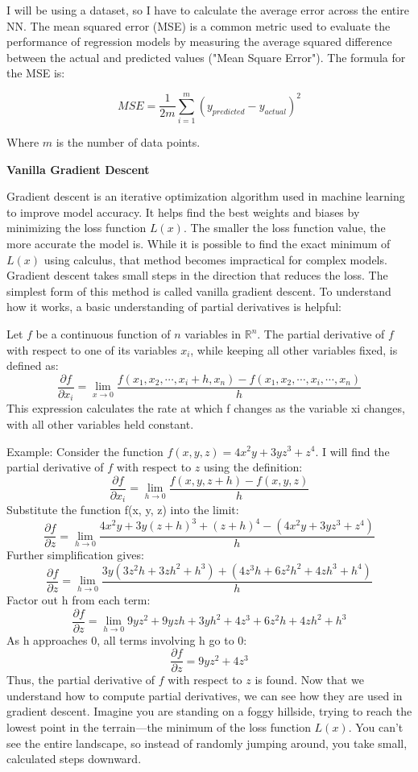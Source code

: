 \documentclass[12pt]{article}
\theoremstyle{definition}
\begin{document}
I will be using a dataset, so I have to calculate the average error across the entire NN. The mean squared error (MSE) is a common metric used to evaluate the performance of regression models by measuring the average squared difference between the actual and predicted values ("Mean Square Error"). The formula for the MSE is:

\[
MSE = \frac{1}{2m} \sum_{i=1}^{m} (y_{predicted} - y_{actual})^2
\]

Where \( m \) is the number of data points.

\begin{flushleft}
\textbf{Vanilla Gradient Descent}
\end{flushleft}

Gradient descent is an iterative optimization algorithm used in machine learning to improve model accuracy. It helps find the best weights and biases by minimizing the loss function $L(x)$. The smaller the loss function value, the more accurate the model is. While it is possible to find the exact minimum of $L(x)$ using calculus, that method becomes impractical for complex models. Gradient descent takes small steps in the direction that reduces the loss. The simplest form of this method is called vanilla gradient descent. To understand how it works, a basic understanding of partial derivatives is helpful:

Let $f$ be a continuous function of $n$ variables in $\mathbb{R}^n$. The partial derivative of $f$ with respect to one of its variables $x_i$, while keeping all other variables fixed, is defined as:
\[
\frac{\partial f}{\partial x_i} = \lim_{x\to 0} \frac{f(x_1,x_2, \cdots,x_i + h, x_n) - f(x_1,x_2, \cdots,x_i,\cdots,x_n)}{h} 
\]
This expression calculates the rate at which f changes as the variable xi changes, with all other variables held constant.

Example: Consider the function $f(x, y, z) = 4x^2y + 3yz^3 + z^4$. I will find the partial derivative of $f$ with respect to $z$ using the definition:
\[
\frac{\partial f}{\partial x_i} = \lim_{h\to 0} \frac{f(x,y,z+h) - f(x,y,z)}{h} 
\]
Substitute the function f(x, y, z) into the limit:
\[
\frac{\partial f}{\partial z} = \lim_{h\to 0} \frac{4x^2y + 3y(z+h)^3 + (z+h)^4 - (4x^2y + 3yz^3 + z^4)}{h} 
\]
Further simplification gives:
\[
\frac{\partial f}{\partial z} = \lim_{h\to 0} \frac{3y(3z^2h+3zh^2+h^3) +(4z^3h + 6z^2h^2 + 4zh^3 +h^4)}{h} 
\]
Factor out h from each term:
\[
\frac{\partial f}{\partial z} = \lim_{h\to 0} 9yz^2+9yzh+3yh^2 +4z^3+ 6z^2h + 4zh^2 + h^3 
\]
As h approaches 0, all terms involving h go to 0:
\[
\frac{\partial f}{\partial z} = 9yz^2+4z^3 
\]
Thus, the partial derivative of $f$ with respect to $z$ is found. Now that we understand how to compute partial derivatives, we can see how they are used in gradient descent. Imagine you are standing on a foggy hillside, trying to reach the lowest point in the terrain—the minimum of the loss function $L(x)$. You can't see the entire landscape, so instead of randomly jumping around, you take small, calculated steps downward.
\end{document}
